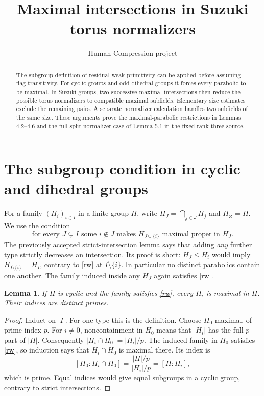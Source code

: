\documentclass[11pt,a4paper]{article}
\title{Maximal intersections in Suzuki torus normalizers}
\author{Human Compression project}\date{}
\newtheorem{lemma}{Lemma}
\begin{document}
\maketitle
\begin{abstract}
The subgroup definition of residual weak primitivity can be applied before
assuming flag transitivity. For cyclic groups and odd dihedral groups it
forces every parabolic to be maximal. In Suzuki groups, two successive
maximal intersections then reduce the possible torus normalizers to
compatible maximal subfields. Elementary size estimates exclude the
remaining pairs. A separate normalizer calculation handles two subfields
of the same size. These arguments prove the maximal-parabolic restrictions
in Lemmas 4.2--4.6 and the full split-normalizer case of Lemma 5.1 in the
fixed rank-three source.
\end{abstract}

\section{The subgroup condition in cyclic and dihedral groups}
For a family $(H_i)_{i\in I}$ in a finite group $H$, write
$H_J=\bigcap_{j\in J}H_j$ and $H_\varnothing=H$. We use the condition
\begin{equation}\label{rw}
 \text{for every }J\subsetneq I\text{ some }i\notin J
 \text{ makes }H_{J\cup\{i\}}\text{ maximal proper in }H_J.
\end{equation}
The previously accepted strict-intersection lemma says that adding
\emph{any} further type strictly decreases an intersection. Its proof is
short: $H_J\le H_i$ would imply
$H_{I\setminus\{i\}}=H_I$, contrary to \eqref{rw} at
$I\setminus\{i\}$. In particular no distinct parabolics contain one
another. The family induced inside any $H_J$ again satisfies \eqref{rw}.

\begin{lemma}\label{cyclic}
If $H$ is cyclic and the family satisfies \eqref{rw}, every $H_i$ is
maximal in $H$. Their indices are distinct primes.
\end{lemma}
\begin{proof}
Induct on $|I|$. For one type this is the definition. Choose $H_0$
maximal, of prime index $p$. For $i\ne0$, noncontainment in $H_0$
means that $|H_i|$ has the full $p$-part of $|H|$. Consequently
$|H_i\cap H_0|=|H_i|/p$. The induced family in $H_0$ satisfies
\eqref{rw}, so induction says that $H_i\cap H_0$ is maximal there.
Its index is
\[
 [H_0:H_i\cap H_0]=\frac{|H|/p}{|H_i|/p}=[H:H_i],
\]
which is prime. Equal indices would give equal subgroups in a cyclic
group, contrary to strict intersections.
\end{proof}
\end{document}
